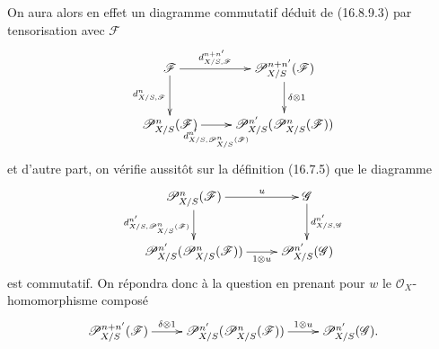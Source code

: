 On aura alors en effet un diagramme commutatif déduit de (16.8.9.3) par
tensorisation avec $\mathscr{F}$
\[
  \xymatrix{
    \mathscr{F}\ar[r]^-{d_{X/S,\mathscr{F}}^{n+n'}}
      \ar[d]_-{d_{X/S,\mathscr{F}}^n}
      &\mathscr{P}_{X/S}^{n+n'}(\mathscr{F})
        \ar[d]^-{\delta\otimes1}\\
    \mathscr{P}_{X/S}^n(\mathscr{F})
      \ar[r]_-{d_{X/S,\mathscr{P}_{X/S}^n(\mathscr{F})}^{n'}}
      &\mathscr{P}_{X/S}^{n'}(\mathscr{P}_{X/S}^n(\mathscr{F}))
  }
\]
et d'autre part, on vérifie aussitôt sur la définition (16.7.5) que le
diagramme
\[
  \xymatrix{
    \mathscr{P}_{X/S}^n(\mathscr{F})\ar[r]^-u
      \ar[d]_-{d_{X/S,\mathscr{P}_{X/S}^n(\mathscr{F})}^{n'}}
      &\mathscr{G}\ar[d]^-{d_{X/S,\mathscr{G}}^{n'}}\\
    \mathscr{P}_{X/S}^{n'}(\mathscr{P}_{X/S}^n(\mathscr{F}))
      \ar[r]_-{1\otimes u}
      &\mathscr{P}_{X/S}^{n'}(\mathscr{G})
  }
\]
est commutatif. On répondra donc à la question en prenant pour $w$ le
$\mathcal{O}_X$-homomorphisme composé
\[
  \xymatrix{
    \mathscr{P}_{X/S}^{n+n'}(\mathscr{F})
      \ar[r]^-{\delta\otimes1}
      &\mathscr{P}_{X/S}^{n'}(\mathscr{P}_{X/S}^n(\mathscr{F}))
        \ar[r]^-{1\otimes u}
      &\mathscr{P}_{X/S}^{n'}(\mathscr{G}).
  }
\]


